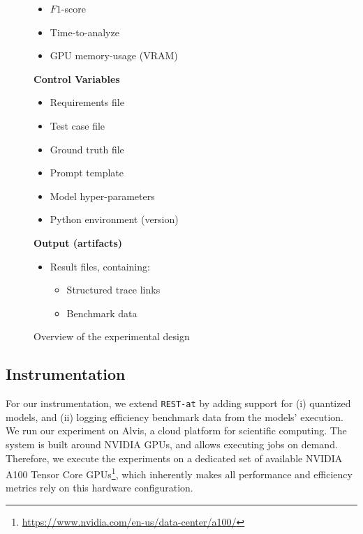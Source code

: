 \begin{figure}[h]
\begin{center}
\begin{tcbraster}[raster columns=2, raster column skip=5pt, raster equal height=rows, raster row skip=5pt]
\begin{roundedBox}
\begin{itemize}
                \item $F1$-score
                \item Time-to-analyze
                \item GPU memory-usage (VRAM)
            \end{itemize}
        \end{roundedBox}
        \begin{roundedBox}
            \centering 
            \textbf{Control Variables}
            \begin{itemize}
                \item Requirements file
                \item Test case file
                \item Ground truth file
                \item Prompt template
                \item Model hyper-parameters
                \item Python environment (version)
            \end{itemize}
        \end{roundedBox}
        \end{tcbraster}
        \begin{roundedBox}
            \centering
            \textbf{Output (artifacts)}
            \begin{itemize}
                \item Result files, containing:
                \begin{itemize}
                    \item Structured trace links
                    \item Benchmark data
                \end{itemize}
            \end{itemize}
        \end{roundedBox}
    \caption{Overview of the experimental design}
    \label{fig:exp-design}
\end{center}
\end{figure}

\subsection{Instrumentation}\label{sec:instrumentation}
For our instrumentation, we extend \verb|REST-at| by adding support for (i) quantized models, and (ii) logging efficiency benchmark data from the models' execution. We run our experiment on Alvis, a cloud platform for scientific computing. The system is built around NVIDIA GPUs, and allows executing jobs on demand. Therefore, we execute the experiments on a dedicated set of available NVIDIA A100 Tensor Core GPUs\footnote{\url{https://www.nvidia.com/en-us/data-center/a100/}}, which inherently makes all performance and efficiency metrics rely on this hardware configuration.

